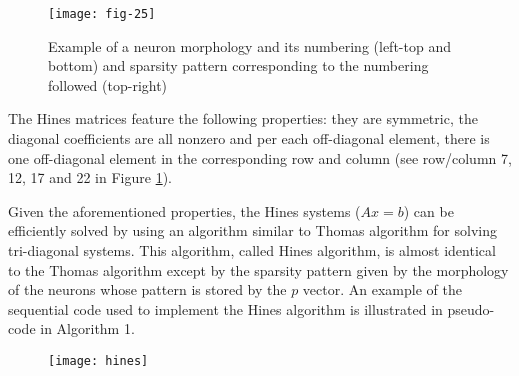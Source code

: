 \vspace{5ex}
\begin{figure}[htbp]
    \centering
    \texttt{[image: fig-25]}
    \label{fig:25}
    \caption{Example of a neuron morphology and its numbering (left-top and bottom)
    and sparsity pattern corresponding to the numbering followed (top-right)}
\end{figure}

The Hines matrices feature the following properties: they are symmetric, the diagonal
coefficients are all nonzero and per each off-diagonal element, there is one off-diagonal
element in the corresponding row and column (see row/column 7, 12, 17 and 22 in
Figure \ref{fig:25}).

Given the aforementioned properties, the Hines systems ($Ax = b$) can be efficiently
solved by using an algorithm similar to Thomas algorithm for solving tri-diagonal systems. This algorithm, called Hines algorithm, is almost identical to the Thomas algorithm except by the sparsity pattern given by the morphology of the neurons whose
pattern is stored by the $p$ vector. An example of the sequential code used to implement
the Hines algorithm is illustrated in pseudo-code in Algorithm 1.


\vspace{5ex}
\begin{figure}[htbp]
    \centering
    \texttt{[image: hines]}
    \label{fig:hines}
\end{figure}















